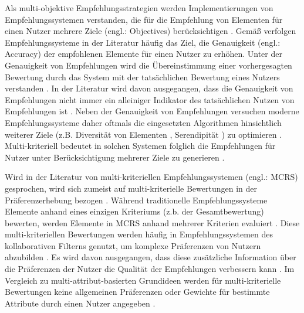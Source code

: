 Als multi-objektive Empfehlungsstrategien werden Implementierungen von Empfehlungssystemen verstanden, die für die Empfehlung von Elementen für einen Nutzer mehrere Ziele (engl.: Objectives) berücksichtigen \cite[S. 850]{adomavicius:4:inbook}.
Gemäß \textcite[S. 1097]{mcnee:inproceedings} verfolgen Empfehlungssysteme in der Literatur häufig das Ziel, die Genauigkeit (engl.: Accuracy) der empfohlenen Elemente für einen Nutzer zu erhöhen.
Unter der Genauigkeit von Empfehlungen wird die Übereinstimmung einer vorhergesagten Bewertung durch das System mit der tatsächlichen Bewertung eines Nutzers verstanden \cite[S. 1098]{mcnee:inproceedings}.
In der Literatur wird davon ausgegangen, dass die Genauigkeit von Empfehlungen nicht immer ein alleiniger Indikator des tatsächlichen Nutzen von Empfehlungen ist \cite[S. 1097]{mcnee:inproceedings}\cite[S. 850]{adomavicius:4:inbook}\cite[S. 896]{adomavicius:article}.
Neben der Genauigkeit von Empfehlungen versuchen moderne Empfehlungssysteme daher oftmals die eingesetzten Algorithmen hinsichtlich weiterer Ziele (z.B. Diversität von Elementen \cite[S. 896]{adomavicius:article}, Serendipität \cite[S. 1099]{mcnee:inproceedings}) zu optimieren \cite[S. 850]{adomavicius:4:inbook}.
Multi-kriteriell bedeutet in solchen Systemen folglich die Empfehlungen für Nutzer unter Berücksichtigung mehrerer Ziele zu generieren \cite[S. 850]{adomavicius:4:inbook}.

Wird in der Literatur von multi-kriteriellen Empfehlungssystemen (engl.: \ac{MCRS}) gesprochen, wird sich zumeist auf multi-kriterielle Bewertungen in der Präferenzerhebung bezogen \cite[S. 207]{hdioud:inproceedings}\cite[S. 1156]{gupta:inproceedings}\cite[S. 327]{hassan:inproceedings}\cite[S. 2453]{zheng:inproceedings}.
Während traditionelle Empfehlungssysteme Elemente anhand eines einzigen Kriteriums (z.b. der Gesamtbewertung) bewerten, werden Elemente in \ac{MCRS} anhand mehrerer Kriterien evaluiert \cite[S. 850]{adomavicius:4:inbook}\cite[S. 2]{adomavicius:5:inbook}.
Diese multi-kriteriellen Bewertungen werden häufig in Empfehlungssystemen des kollaborativen Filterns genutzt, um komplexe Präferenzen von Nutzern abzubilden \cite[S. 850]{adomavicius:4:inbook}.
Es wird davon ausgegangen, dass diese zusätzliche Information \cite[S. 49]{adomavicius:inproceedings:2} über die Präferenzen der Nutzer die Qualität der Empfehlungen verbessern kann \cite[S. 2]{adomavicius:5:inbook}.
Im Vergleich zu multi-attribut-basierten Grundideen werden für multi-kriterielle Bewertungen keine allgemeinen Präferenzen oder Gewichte für bestimmte Attribute durch einen Nutzer angegeben \cite[S. 851]{adomavicius:4:inbook}.

